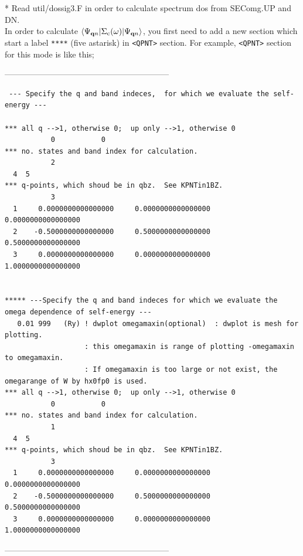 \documentclass[a4paper,10pt,epsf,fleqn]{article}
\begin{document}
{{{* Read util/dossig3.F in order to calculate spectrum dos from SEComg.UP and DN.\\


In order to calculate $\langle \Psi_{{\bf q} n} |\Sigma_{\rm c}(\omega)| \Psi_{{\bf q} n}\rangle$,
you first need to add a new section which start a label { \tt *****} (five astarisk) in \verb#<QPNT># section.
For example, \verb#<QPNT># section for this mode is like this;

\hspace{2cm}------------------------------------------------------------

{\baselineskip=2mm \small
\begin{verbatim}
 --- Specify the q and band indeces,  for which we evaluate the self-energy ---

*** all q -->1, otherwise 0;  up only -->1, otherwise 0
           0           0
*** no. states and band index for calculation.
           2
  4  5
*** q-points, which shoud be in qbz.  See KPNTin1BZ.
           3
  1     0.0000000000000000     0.0000000000000000     0.0000000000000000
  2    -0.5000000000000000     0.5000000000000000     0.5000000000000000
  3     0.0000000000000000     0.0000000000000000     1.0000000000000000


***** ---Specify the q and band indeces for which we evaluate the omega dependence of self-energy ---
   0.01 999   (Ry) ! dwplot omegamaxin(optional)  : dwplot is mesh for plotting.
                   : this omegamaxin is range of plotting -omegamaxin to omegamaxin.
                   : If omegamaxin is too large or not exist, the omegarange of W by hx0fp0 is used.
*** all q -->1, otherwise 0;  up only -->1, otherwise 0
           0           0
*** no. states and band index for calculation.
           1
  4  5
*** q-points, which shoud be in qbz.  See KPNTin1BZ.
           3
  1     0.0000000000000000     0.0000000000000000     0.0000000000000000
  2    -0.5000000000000000     0.5000000000000000     0.5000000000000000
  3     0.0000000000000000     0.0000000000000000     1.0000000000000000
\end{verbatim}
}

\hspace{2cm}------------------------------------------------------------

}}}
\end{document}
